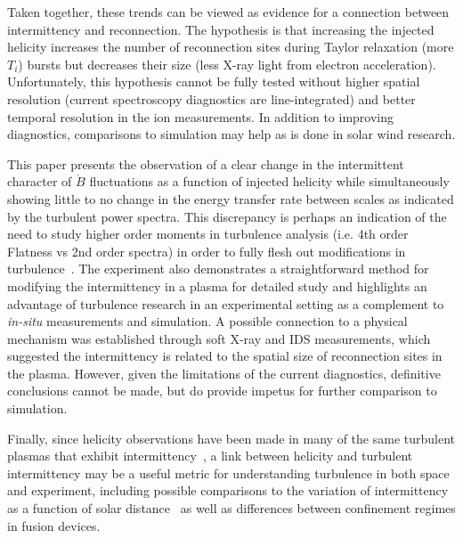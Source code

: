 \documentclass[aps,prl,amsmath,amssymb,reprint,superscriptaddress]{revtex4-1} %
\begin{document}
Taken together, these trends can be viewed as evidence for a connection between intermittency and reconnection. The hypothesis is that increasing the injected helicity increases the number of reconnection sites during Taylor relaxation (more $T_{i}$) bursts but decreases their size (less X-ray light from electron acceleration). Unfortunately, this hypothesis cannot be fully tested without higher spatial resolution (current spectroscopy diagnostics are line-integrated) and better temporal resolution in the ion measurements. In addition to improving diagnostics, comparisons to simulation may help as is done in solar wind research.

This paper presents the observation of a clear change in the intermittent character of $\dot{B}$ fluctuations as a function of injected helicity while simultaneously showing little to no change in the energy transfer rate between scales as indicated by the turbulent power spectra. This discrepancy is perhaps an indication of the need to study higher order moments in turbulence analysis (i.e. 4th order Flatness vs 2nd order spectra) in order to fully flesh out modifications in turbulence~\cite{matthaeusVelli11}. The experiment also demonstrates a straightforward method for modifying the intermittency in a plasma for detailed study and highlights an advantage of turbulence research in an experimental setting as a complement to {\it in-situ} measurements and simulation. A possible connection to a physical mechanism was established through soft X-ray and IDS measurements, which suggested the intermittency is related to the spatial size of reconnection sites in the plasma. However, given the limitations of the current diagnostics, definitive conclusions cannot be made, but do provide impetus for further comparison to simulation.

Finally, since helicity observations have been made in many of the same turbulent plasmas that exhibit intermittency~\cite{goldstein94, ji95, telloni12}, a link between helicity and turbulent intermittency may be a useful metric for understanding turbulence in both space and experiment, including possible comparisons to the variation of intermittency as a function of solar distance~\cite{greco12} as well as differences between confinement regimes in fusion devices.
\end{document}
